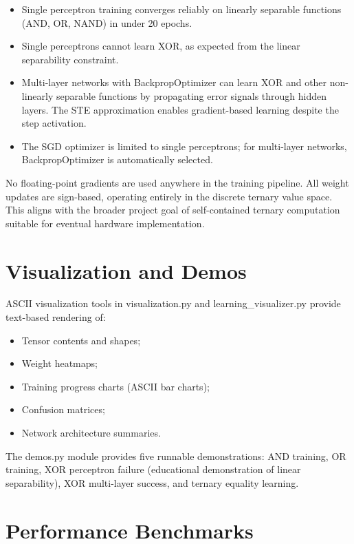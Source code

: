 \documentclass[12pt,a4paper,twoside]{book}
\theoremstyle{trinarytheorem}
\theoremstyle{trinarydefinition}
\newcommand{\code}[1]{\textsf{#1}}
\begin{document}
\begin{itemize}
    \item Single perceptron training converges reliably on linearly
          separable functions (AND, OR, NAND) in under 20 epochs.
    \item Single perceptrons cannot learn XOR, as expected from the
          linear separability constraint.
    \item Multi-layer networks with \code{BackpropOptimizer} can learn
          XOR and other non-linearly separable functions by propagating
          error signals through hidden layers. The STE approximation
          enables gradient-based learning despite the step activation.
    \item The SGD optimizer is limited to single perceptrons; for
          multi-layer networks, \code{BackpropOptimizer} is automatically
          selected.
\end{itemize}

No floating-point gradients are used anywhere in the training pipeline.
All weight updates are sign-based, operating entirely in the discrete
ternary value space. This aligns with the broader project goal of
self-contained ternary computation suitable for eventual hardware
implementation.

\section{Visualization and Demos}

ASCII visualization tools in \code{visualization.py} and
\code{learning\_visualizer.py} provide text-based rendering of:
\begin{itemize}
    \item Tensor contents and shapes;
    \item Weight heatmaps;
    \item Training progress charts (ASCII bar charts);
    \item Confusion matrices;
    \item Network architecture summaries.
\end{itemize}

The \code{demos.py} module provides five runnable demonstrations:
AND training, OR training, XOR perceptron failure (educational
demonstration of linear separability), XOR multi-layer success, and
ternary equality learning.

\section{Performance Benchmarks}
\end{document}
